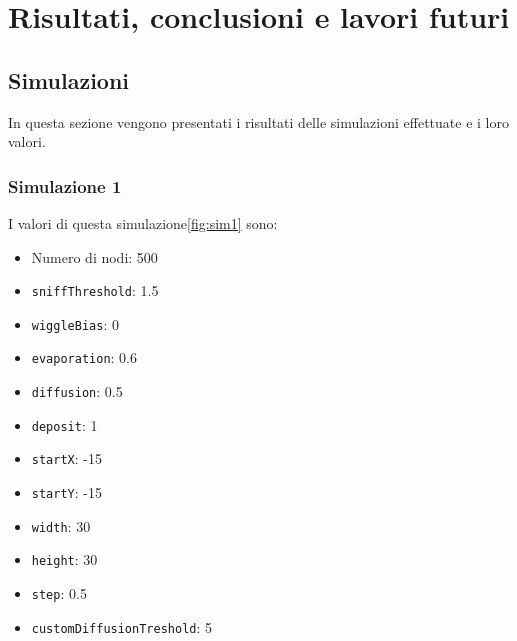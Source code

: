 \chapter{Risultati, conclusioni e lavori futuri}
\section{Simulazioni}
In questa sezione vengono presentati i risultati delle simulazioni effettuate e i loro valori.
\subsection{Simulazione 1}\label{sim1}
I valori di questa simulazione\space \cref{fig:sim1} sono:
\begin{itemize}
    \item Numero di nodi: 500
    \item \texttt{sniffThreshold}: 1.5
    \item \texttt{wiggleBias}: 0
    \item \texttt{evaporation}: 0.6
    \item \texttt{diffusion}: 0.5
    \item \texttt{deposit}: 1
    \item \texttt{startX}: -15
    \item \texttt{startY}: -15
    \item \texttt{width}: 30
    \item \texttt{height}: 30
    \item \texttt{step}: 0.5
    \item \texttt{customDiffusionTreshold}: 5
\end{itemize}
